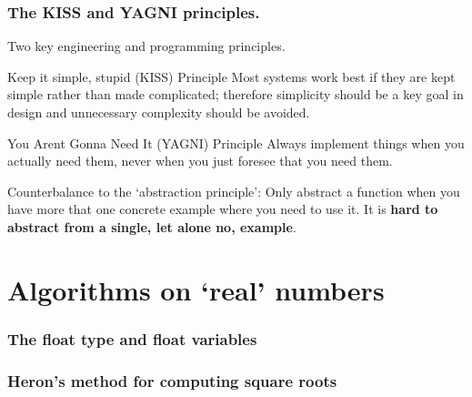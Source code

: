 \documentclass{beamer} %
\newcommand\emc[1]{\textcolor{brightblue}{\textbf{#1}}}
\begin{document}
\begin{frame}
\frametitle{The KISS and YAGNI principles.}

Two key engineering and programming principles.

\begin{block}{Keep it simple, stupid (KISS) Principle}
Most systems work best if they are kept simple rather than made complicated; therefore simplicity should be a key goal in design and unnecessary complexity should be avoided.
\end{block}

\begin{block}{You Arent Gonna Need It (YAGNI) Principle}
Always implement things when you actually need them, never when you just foresee that you need them.
\end{block}

Counterbalance to the `abstraction principle': Only abstract a function when you have more that one concrete example where you need to use it. It is \emc{hard to abstract from a single, let alone no, example}.

\end{frame}

\section{Algorithms on `real' numbers}

\begin{frame}
\frametitle{The float type and float variables}
\end{frame}


\begin{frame}
\frametitle{Heron's method for computing square roots}
\end{frame}

\end{document}
